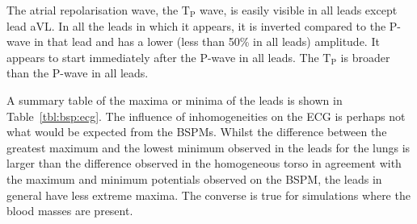 The atrial repolarisation wave, the $\text{T}_{\text{P}}$ wave, is easily
visible in all leads except lead aVL.
In all the leads in which it appears, it is inverted compared to the P-wave in
that lead and has a lower (less than 50\% in all leads) amplitude.
It appears to start immediately after the P-wave in all leads.
The $\text{T}_{\text{P}}$ is broader than the P-wave in all leads.

A summary table of the maxima or minima of the leads is shown in
Table~\ref{tbl:bsp:ecg}.
The influence of inhomogeneities on the ECG is perhaps not what would be
expected from the BSPMs.
Whilst the difference between the greatest maximum and the lowest minimum
observed in the leads for the lungs is larger than the difference observed in
the homogeneous torso in agreement with the maximum and minimum potentials
observed on the BSPM, the leads in general have less extreme maxima.
The converse is true for simulations where the blood masses are present.


